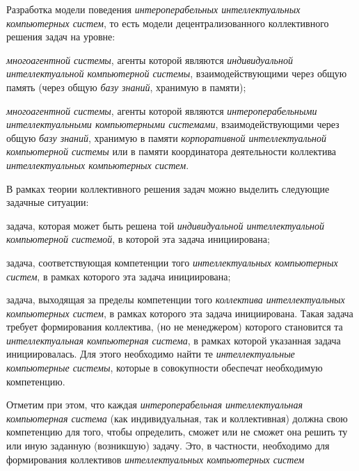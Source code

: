 \begin{textitemize}
	\medskip
	\item Разработка модели  поведения \textit{интероперабельных интеллектуальных компьютерных систем}, то есть модели децентрализованного коллективного решения задач на уровне:
	\begin{textitemize}
		\item \textit{многоагентной системы}, агенты которой являются  \textit{индивидуальной интеллектуальной компьютерной системы}, взаимодействующими через общую память (через общую \textit{базу знаний}, хранимую в  памяти);
		\item \textit{многоагентной системы}, агенты которой являются \textit{интероперабельными интеллектуальными компьютерными системами}, взаимодействующими через общую \textit{базу знаний}, хранимую в памяти \textit{корпоративной интеллектуальной компьютерной системы} или в памяти координатора деятельности  коллектива \textit{интеллектуальных компьютерных систем}. 
	\end{textitemize}
	В рамках теории коллективного решения задач можно выделить следующие задачные ситуации:
	\begin{textitemize}
		\item задача, которая может быть решена той \textit{индивидуальной интеллектуальной компьютерной системой}, в которой эта задача инициирована;
		\item задача, соответствующая компетенции того \textit{ интеллектуальных компьютерных систем}, в рамках которого эта задача инициирована;
		\item задача, выходящая за пределы компетенции того \textit{коллектива интеллектуальных компьютерных систем}, в рамках которого эта задача инициирована. Такая задача требует формирования  коллектива,  (но не менеджером) которого становится та \textit{интеллектуальная компьютерная система}, в рамках которой указанная задача инициировалась. Для этого необходимо найти те \textit{интеллектуальные компьютерные системы}, которые в совокупности обеспечат необходимую компетенцию.
	\end{textitemize}
	Отметим при этом, что каждая \textit{интероперабельная интеллектуальная компьютерная система} (как индивидуальная, так и коллективная) должна  свою компетенцию для того, чтобы определить, сможет или не сможет она решить ту или иную заданную (возникшую) задачу. Это, в частности, необходимо для формирования  коллективов \textit{интеллектуальных компьютерных систем}

\end{textitemize}
